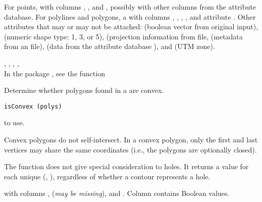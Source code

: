 \documentclass[letterpaper]{book}
\begin{document}
%
\begin{Value}
For points,  with columns , , and
, possibly with other columns from the attribute database. For
polylines and polygons, a  with columns ,
, , ,  and attribute .
Other attributes that may or may not be attached:  
(boolean vector from original input),  (numeric shape 
type: 1, 3, or 5),  (projection information from  
file,  (metadata from an  file),  
(data from the attribute database ), and  (UTM zone).
\end{Value}
%
\begin{SeeAlso}\relax
{}, , 
, , 
 \\{}
In the package , see the function 
\end{SeeAlso}
%
\begin{Description}\relax
Determine whether polygons found in a  are convex.
\end{Description}
%
\begin{Usage}
\begin{verbatim}
isConvex (polys)
\end{verbatim}
\end{Usage}
%
\begin{Arguments}
\begin{ldescription}
\item[\code{polys}]  to use.
\end{ldescription}
\end{Arguments}
%
\begin{Details}\relax
Convex polygons do not self-intersect.  In a convex polygon, only the
first and last vertices may share the same coordinates (i.e., the
polygons are optionally closed).

The function does not give special consideration to holes.  It returns
a value for each unique (, ), regardless of
whether a contour represents a hole.
\end{Details}
%
\begin{Value}
 with columns ,  (\emph{may be missing}),
and .  Column  contains Boolean values.
\end{Value}
\end{document}
